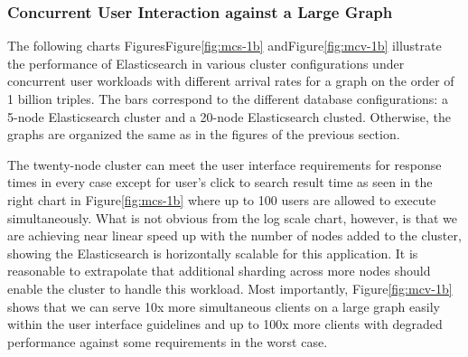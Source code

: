 \subsubsection{Concurrent User Interaction against a Large Graph}
The following charts FiguresFigure\ref{fig:mcs-1b} andFigure\ref{fig:mcv-1b} illustrate the performance of Elasticsearch in various cluster configurations under concurrent user workloads with different arrival rates for a graph on the order of 1 billion triples. 
The bars correspond to the different database configurations: a 5-node Elasticsearch cluster and a 20-node Elasticsearch clusted. 
Otherwise, the graphs are organized the same as in the figures of the previous section.

The twenty-node cluster can meet the user interface requirements for response times in every case except for user's click to search result time as seen in the right chart in Figure\ref{fig:mcs-1b} where up to 100 users are allowed to execute simultaneously.  
What is not obvious from the log scale chart, however, is that we are achieving near linear speed up with the number of nodes added to the cluster, showing the Elasticsearch is horizontally scalable for this application.
It is reasonable to extrapolate that additional sharding across more nodes should enable the cluster to handle this workload.
Most importantly, Figure\ref{fig:mcv-1b} shows that we can serve 10x more simultaneous clients on a large graph easily within the user interface guidelines and up to 100x more clients with degraded performance against some requirements in the worst case.  
